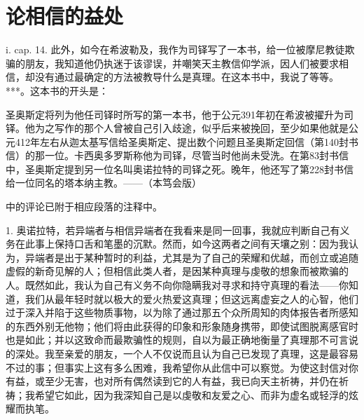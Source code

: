 
\chapter{论相信的益处}


 i. cap. 14. 此外，如今在希波勒及，我作为司铎写了一本书，给一位被摩尼教徒欺骗的朋友，我知道他仍执迷于该谬误，并嘲笑天主教信仰学派，因人们被要求相信，却没有通过最确定的方法被教导什么是真理。在这本书中，我说了等等。***。这本书的开头是：\par

圣奥斯定将列为他任司铎时所写的第一本书，他于公元391年初在希波被擢升为司铎。他为之写作的那个人曾被自己引入歧途，似乎后来被挽回，至少如果他就是公元412年左右从迦太基写信给圣奥斯定、提出数个问题且圣奥斯定回信（第140封书信）的那一位。卡西奥多罗斯称他为司铎，尽管当时他尚未受洗。在第83封书信中，圣奥斯定提到另一位名叫奥诺拉特的司铎之死。晚年，他还写了第228封书信给一位同名的塔本纳主教。——（本笃会版）\par

中的评论已附于相应段落的注释中。\par

1. 奥诺拉特，若异端者与相信异端者在我看来是同一回事，我就应判断自己有义务在此事上保持口舌和笔墨的沉默。然而，如今这两者之间有天壤之别：因为我认为，异端者是出于某种暂时的利益，尤其是为了自己的荣耀和优越，而创立或追随虚假的新奇见解的人；但相信此类人者，是因某种真理与虔敬的想象而被欺骗的人。既然如此，我认为自己有义务不向你隐瞒我对寻求和持守真理的看法——你知道，我们从最年轻时就以极大的爱火热爱这真理；但这远离虚妄之人的心智，他们过于深入并陷于这些物质事物，以为除了通过那五个众所周知的肉体报告者所感知的东西外别无他物；他们将由此获得的印象和形象随身携带，即使试图脱离感官时也是如此；并以这致命而最欺骗性的规则，自以为最正确地衡量了真理那不可言说的深处。我至亲爱的朋友，一个人不仅说而且认为自己已发现了真理，这是最容易不过的事；但事实上这有多么困难，我希望你从此信中可以察觉。为使这封信对你有益，或至少无害，也对所有偶然读到它的人有益，我已向天主祈祷，并仍在祈祷；我希望它如此，因为我深知自己是以虔敬和友爱之心、而非为虚名或轻浮的炫耀而执笔。\par

